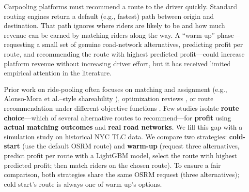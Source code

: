 \documentclass[11pt,a4paper]{article}
\begin{document}
Carpooling platforms must recommend a route to the driver quickly. Standard routing engines return a default (e.g., fastest) path between origin and destination. That path ignores where riders are likely to be and how much revenue can be earned by matching riders along the way. A ``warm-up'' phase---requesting a small set of genuine road-network alternatives, predicting profit per route, and recommending the route with highest predicted profit---could increase platform revenue without increasing driver effort, but it has received limited empirical attention in the literature.

Prior work on ride-pooling often focuses on matching and assignment (e.g., Alonso-Mora et al.--style shareability \cite{alonso-mora}), optimization reviews \cite{agatz-review}, or route recommendation under different objective functions \cite{bassem-route}. Few studies isolate \textbf{route choice}---which of several alternative routes to recommend---for \textbf{profit} using \textbf{actual matching outcomes} and \textbf{real road networks}. We fill this gap with a simulation study on historical NYC TLC data. We compare two strategies: \textbf{cold-start} (use the default OSRM route) and \textbf{warm-up} (request three alternatives, predict profit per route with a LightGBM model, select the route with highest predicted profit; then match riders on the chosen route). To ensure a fair comparison, both strategies share the same OSRM request (three alternatives); cold-start's route is always one of warm-up's options.
\end{document}
